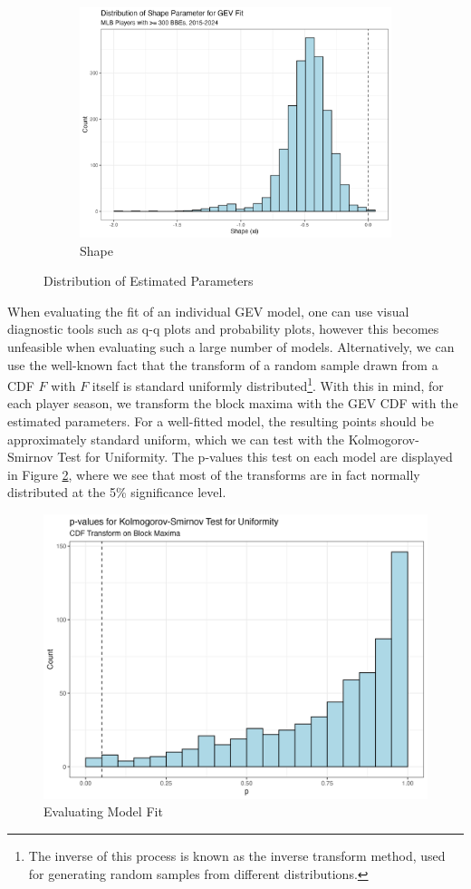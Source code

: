 \documentclass[12pt, TexShade, letterpaper]{report}
\begin{document}
\begin{figure}[ht]
\begin{subfigure}[]{0.45\textwidth}
        \includegraphics[width=\textwidth]{plots/shape.png}
        \caption{Shape}
    \end{subfigure}
    \caption{Distribution of Estimated Parameters}
    \label{fig:params}
\end{figure}

When evaluating the fit of an individual GEV model, one can use visual diagnostic tools such as q-q plots and probability plots, however this becomes unfeasible when evaluating such a large number of models. Alternatively, we can use the well-known fact that the transform of a random sample drawn from a CDF $F$ with $F$ itself is standard uniformly distributed\footnote{The inverse of this process is known as the inverse transform method, used for generating random samples from different distributions.}. With this in mind, for each player season, we transform the block maxima with the GEV CDF with the estimated parameters. For a well-fitted model, the resulting points should be approximately standard uniform, which we can test with the Kolmogorov-Smirnov Test for Uniformity. The p-values this test on each model are displayed in Figure \ref{fig:ks-test}, where we see that most of the transforms are in fact normally distributed at the 5\% significance level.

\begin{figure}[ht]
    \centering
    \includegraphics[width=0.75\linewidth]{plots/kstest.png}
    \caption{Evaluating Model Fit}
    \label{fig:ks-test}
\end{figure}
\end{document}
